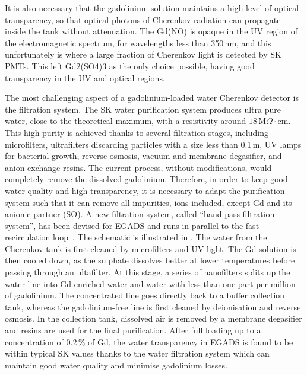 It is also necessary that the gadolinium solution maintains a high level of optical transparency, %
so that optical photons of Cherenkov radiation can propagate inside the tank without attenuation.
The Gd(NO) is opaque in the UV region of the electromagnetic spectrum, for wavelengths less than 350\,nm, %
and this unfortunately is where a large fraction of Cherenkov light is detected by SK PMTs.
This left Gd2(SO4)3 as the only choice possible, having good transparency in the UV and optical regions.

The most challenging aspect of a gadolinium-loaded water Cherenkov detector is the filtration system.
The SK water purification system produces ultra pure water, close to the theoretical maximum, %
with a resistivity around $18$\,M$\Omega\cdot$cm.
This high purity is achieved thanks to several filtration stages, including microfilters, %
ultrafilters discarding particles with a size less than 0.1\,\textmu m, UV lamps for bacterial growth, %
reverse osmosis, vacuum and membrane degasifier, and anion-exchange resins.
The current process, without modifications, would completely remove the dissolved gadolinium.
Therefore, in order to keep good water quality and high transparency, it is necessary to adapt the purification system %
such that it can remove all impurities, ions included, except Gd and its anionic partner (SO).
A new filtration system, called ``band-pass filtration system'', has been devised for EGADS and runs in parallel to %
the fast-recirculation loop~\cite{Ikeda:2019pcm}.
The schematic is illustrated in .
The water from the Cherenkov tank is first cleaned by microfilters and UV light.
The Gd solution is then cooled down, as the sulphate dissolves better at lower temperatures %
before passing through an ultafilter.
At this stage, a series of nanofilters splits up the water line into Gd-enriched water and %
water with less than one part-per-million of gadolinium.
The concentrated line goes directly back to a buffer collection tank, whereas the gadolinium-free line %
is first cleaned by deionisation and reverse osmosis.
In the collection tank, dissolved air is removed by a membrane degasifier and resins are used %
for the final purification.
After full loading up to a concentration of 0.2\,\% of Gd, the water transparency in EGADS is found to be within typical SK values %
thanks to the water filtration system which can maintain good water quality and minimise gadolinium losses.

